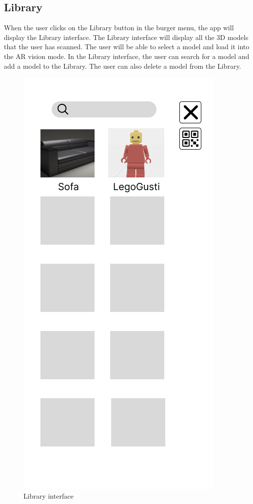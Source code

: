 \subsection{Library}
When the user clicks on the Library button in the burger menu, the app will display the Library interface. The Library interface will display all the 3D models that the user has scanned. The user will be able to select a model and load it into the AR vision mode. In the Library interface, the user can search for a model and add a model to the Library. The user can also delete a model from the Library.
\begin{figure}[h!]
    \begin{center}
        \includegraphics[scale=0.5]{img/App_mock/iPhone 14 - 10.png}
        \caption{Library interface}
        \label{fig:library}
    \end{center}
\end{figure}
\pagebreak

